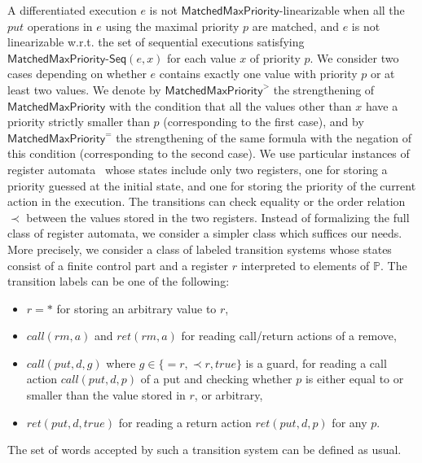A differentiated execution $e$ is not $\mathsf{MatchedMaxPriority}$-linearizable when all the $\textit{put}$ operations in $e$ using the maximal priority $p$ are matched, and $e$ is not linearizable w.r.t. the set of sequential executions satisfying $\mathsf{MatchedMaxPriority\text{-}Seq}(e,x)$ for each value $x$ of priority $p$. We consider two cases depending on whether $e$ contains exactly one value with priority $p$ or at least two values. We denote by $\mathsf{MatchedMaxPriority}^{>}$ the strengthening of $\mathsf{MatchedMaxPriority}$ with the condition that all the values other than $x$ have a priority strictly smaller than $p$ (corresponding to the first case), and by $\mathsf{MatchedMaxPriority}^{=}$ the strengthening of the same formula with the negation of this condition (corresponding to the second case).
We use particular instances of register automata~\cite{DBLP:journals/tcs/KaminskiF94,DBLP:conf/icalp/Cerans94,DBLP:conf/stacs/SegoufinT11} whose states include only two registers, one for storing a priority guessed at the initial state, and one for storing the priority of the current action in the execution. The transitions can check equality or the order relation $\prec$ between the values stored in the two registers. Instead of formalizing the full class of register automata, we consider a simpler class which suffices our needs. More precisely, we consider a class of labeled transition systems whose states consist of a finite control part and a register $r$ interpreted to elements of $\mathbb{P}$. The transition labels can be one of the following:
\begin{itemize}
	\item $r=*$ for storing an arbitrary value to $r$,
	\item $\textit{call}(\textit{rm},a)$ and $\textit{ret}(\textit{rm},a)$ for reading call/return actions of a remove,
	\item $\textit{call}(\textit{put},d,g)$ where $g\in\{=r,\prec r,true\}$ is a guard, for reading a call action $\textit{call}(\textit{put},d,p)$ of a put and checking whether $p$ is either equal to or smaller than the value stored in $r$, or arbitrary,
	\item $\textit{ret}(\textit{put},d,true)$ for reading a return action $\textit{ret}(\textit{put},d,p)$ for any $p$.
\end{itemize}
The set of words accepted by such a transition system can be defined as usual.

